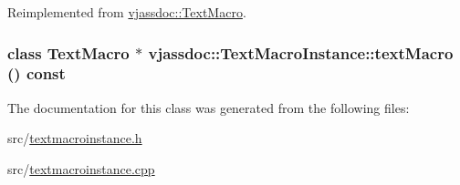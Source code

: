 Reimplemented from \hyperlink{classvjassdoc_1_1TextMacro_e46c88feedc6197fbbae48de17f07366}{vjassdoc::TextMacro}.\hypertarget{classvjassdoc_1_1TextMacroInstance_2ad0f2fc0c5d03502e91899f6621edfc}{
\subsubsection{\setlength{\rightskip}{0pt plus 5cm}class {\bf TextMacro} $\ast$ vjassdoc::TextMacroInstance::textMacro () const}}
\label{classvjassdoc_1_1TextMacroInstance_2ad0f2fc0c5d03502e91899f6621edfc}




The documentation for this class was generated from the following files:\begin{CompactItemize}
\item 
src/\hyperlink{textmacroinstance_8h}{textmacroinstance.h}\item 
src/\hyperlink{textmacroinstance_8cpp}{textmacroinstance.cpp}\end{CompactItemize}
